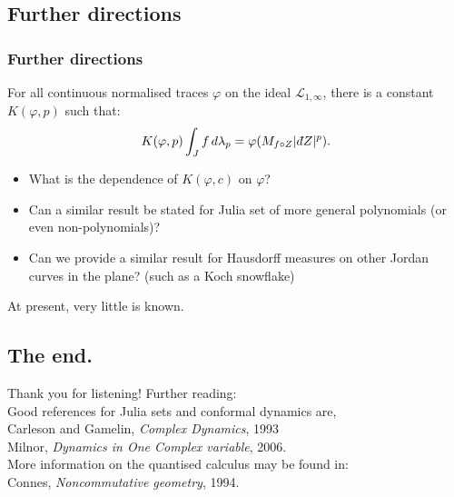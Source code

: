 \documentclass{beamer} %
\theoremstyle{definition} %
\newcommand{\Itgr}{\mathbb{Z}}
\newcommand{\Circ}{\mathbb{T}}
\newcommand{\Lc}{\mathcal{L}}
\newcommand{\sgn}{\mathrm{sgn}}
\def\qd{\,{\mathchar'26\mkern-12mu d}}
\begin{document}
\subsection{Further directions}
\begin{frame}\frametitle{Further directions}
    For all continuous normalised traces $\varphi$ on the ideal $\Lc_{1,\infty}$, there is a constant $K(\varphi,p)$ such that:
    \begin{equation*}
        K(\varphi,p)\int_J f\,d\lambda_p = \varphi(M_{f\circ Z}|\qd Z|^p).
    \end{equation*}
    \begin{itemize}
        \item{} What is the dependence of $K(\varphi,c)$ on $\varphi$?
        \item{} Can a similar result be stated for Julia set of more general polynomials (or even non-polynomials)?
        \item{} Can we provide a similar result for Hausdorff measures on other Jordan curves in the plane? (such as a Koch snowflake)
    \end{itemize}
    At present, very little is known.
\end{frame}

\subsection{The end.}
\begin{frame}
    Thank you for listening!
%     
%     
    Further reading:\\
    Good references for Julia sets and conformal dynamics are,\\
    Carleson and Gamelin, \emph{ Complex Dynamics}, 1993\\
    Milnor, \emph{Dynamics in One Complex variable}, 2006.\\
    
    More information on the quantised calculus may be found in:\\
    Connes, \emph{Noncommutative geometry}, 1994.
\end{frame}


% 
\end{document}
